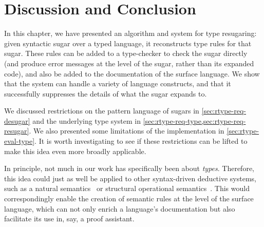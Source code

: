 \section{Discussion and Conclusion}

In this chapter, we have presented an algorithm and system for type resugaring: given
syntactic sugar over a typed language, it reconstructs type rules for
that sugar. These rules can be added to a type-checker to check the
sugar directly (and produce error messages at the level of the sugar,
rather than its expanded code), and also be added to the documentation
of the surface language. We show that the system can handle a variety
of language constructs, and that it successfully suppresses the
details of what the sugar expands to.

We discussed restrictions on the pattern language of sugars in \cref{sec:rtype-req-desugar}
and the underlying type system in \cref{sec:rtype-req-type,sec:rtype-req-resugar}. We also presented
some limitations of the implementation in \cref{sec:rtype-eval-type}. It is
worth investigating to see if these restrictions can be lifted to make
this idea even more broadly applicable.

In principle, not much in our work has specifically been about
\emph{types}. Therefore, this idea could just as well be applied to
other syntax-driven deductive systems, such as a natural
semantics~\cite{gk:natural-semantics}
or structural operational semantics~\cite{gdp:struct-op-sem}. This would
correspondingly enable the creation of semantic rules at the level of
the surface language, which can not only enrich a language's
documentation but also facilitate its use in, say, a proof assistant.

